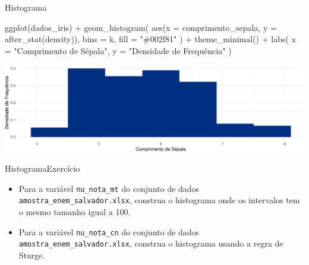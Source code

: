 \documentclass[
  10pt,
  ignorenonframetext,
]{beamer}
\newenvironment{Shaded}{}{}
\newcommand{\DataTypeTok}[1]{#1}
\newcommand{\KeywordTok}[1]{\textcolor[rgb]{0.00,0.00,1.00}{#1}}
\newcommand{\NormalTok}[1]{#1}
\newcommand{\OperatorTok}[1]{#1}
\newcommand{\StringTok}[1]{\textcolor[rgb]{0.00,0.50,0.50}{#1}}
\providecommand{\tightlist}{%
  \setlength{\itemsep}{0pt}\setlength{\parskip}{0pt}}
\begin{document}
\begin{frame}[fragile]{Histograma}
\protect\hypertarget{histograma-2}{}
\begin{Shaded}
\begin{Highlighting}[]
\KeywordTok{ggplot}\NormalTok{(dados\_iris) }\OperatorTok{+}
\StringTok{  }\KeywordTok{geom\_histogram}\NormalTok{(}
    \KeywordTok{aes}\NormalTok{(}\DataTypeTok{x =}\NormalTok{ comprimento\_sepala, }\DataTypeTok{y =} \KeywordTok{after\_stat}\NormalTok{(density)),}
    \DataTypeTok{bins =}\NormalTok{ k,}
    \DataTypeTok{fill =} \StringTok{"\#002f81"}
\NormalTok{  ) }\OperatorTok{+}
\StringTok{  }\KeywordTok{theme\_minimal}\NormalTok{() }\OperatorTok{+}
\StringTok{  }\KeywordTok{labs}\NormalTok{(}
    \DataTypeTok{x =} \StringTok{"Comprimento de Sépala"}\NormalTok{,}
    \DataTypeTok{y =} \StringTok{"Densidade de Frequência"}
\NormalTok{  )}
\end{Highlighting}
\end{Shaded}

\begin{center}\includegraphics[width=1\linewidth]{aulas_files/figure-beamer/unnamed-chunk-62-1} \end{center}
\end{frame}

\begin{frame}[fragile]{Histograma\newline Exercício}
\protect\hypertarget{histogramaexercuxedcio}{}
\begin{itemize}
\tightlist
\item
  Para a variável \texttt{nu\_nota\_mt} do conjunto de dados
  \texttt{amostra\_enem\_salvador.xlsx}, construa o histograma onde os
  intervalos tem o mesmo tamanho igual a 100.
\item
  Para a variável \texttt{nu\_nota\_cn} do conjunto de dados
  \texttt{amostra\_enem\_salvador.xlsx}, construa o histograma usando a
  regra de Sturge.
\end{itemize}
\end{frame}
\end{document}
